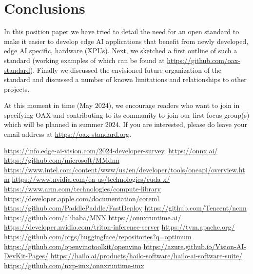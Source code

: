 \documentclass{article}
\newcommand{\oaxweb}{\href{https://oax-standard.org}{https://oax-standard.org}}
\newcommand{\oaxgit}{\href{https://github.com/oax-standard}{https://github.com/oax-standard}}
\begin{document}
\section{Conclusions}

In this position paper we have tried to detail the need for an open standard to make it easier to develop edge AI applications that benefit from newly developed, edge AI specific, hardware (XPUs). Next, we sketched a first outline of such a standard (working examples of which can be found at \oaxgit). Finally we discussed the envisioned future organization of the standard and discussed a number of known limitations and relationships to other projects.

At this moment in time (May 2024), we encourage readers who want to join in specifying OAX and contributing to its community to join our first focus group(s) which will be planned in summer 2024. If you are interested, please do leave your email address at \oaxweb.

\begin{thebibliography}{9}

	 \href{https://info.edge-ai-vision.com/2024-developer-survey}{https://info.edge-ai-vision.com/2024-developer-survey}.
	 \href{https://onnx.ai/}{https://onnx.ai/}
	\href{https://github.com/microsoft/MMdnn}{https://github.com/microsoft/MMdnn}
	\href{https://www.intel.com/content/www/us/en/developer/tools/oneapi/overview.html}{https://www.intel.com/content/www/us/en/developer/tools/oneapi/overview.htm}
	\href{https://www.nvidia.com/en-us/technologies/cuda-x/}{https://www.nvidia.com/en-us/technologies/cuda-x/}
	\href{https://www.arm.com/technologies/compute-library}{https://www.arm.com/technologies/compute-library}
	\href{https://developer.apple.com/documentation/coreml}{https://developer.apple.com/documentation/coreml}
	\href{https://github.com/PaddlePaddle/FastDeploy}{https://github.com/PaddlePaddle/FastDeploy}
	\href{https://github.com/Tencent/ncnn}{https://github.com/Tencent/ncnn}
	\href{https://github.com/alibaba/MNN}{https://github.com/alibaba/MNN}
	\href{https://onnxruntime.ai/}{https://onnxruntime.ai/}
	\href{https://developer.nvidia.com/triton-inference-server}{https://developer.nvidia.com/triton-inference-server}
	\href{https://tvm.apache.org/}{https://tvm.apache.org/}
	\href{https://github.com/orgs/huggingface/repositories?q=optimum}{https://github.com/orgs/huggingface/repositories?q=optimum}
	\href{https://github.com/openvinotoolkit/openvino}{https://github.com/openvinotoolkit/openvino}
	\href{https://azure.github.io/Vision-AI-DevKit-Pages/}{https://azure.github.io/Vision-AI-DevKit-Pages/}
	\href{https://hailo.ai/products/hailo-software/hailo-ai-software-suite/}{https://hailo.ai/products/hailo-software/hailo-ai-software-suite/}
	\href{https://github.com/nxp-imx/onnxruntime-imx}{https://github.com/nxp-imx/onnxruntime-imx}


\end{thebibliography}
\end{document}

